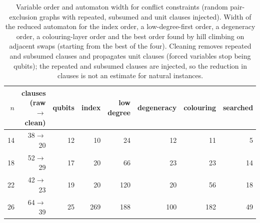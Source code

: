 \begin{table}[t]
\centering\footnotesize\setlength{\tabcolsep}{4pt}
\caption{ Variable order and automaton width for conflict constraints (random pair-exclusion graphs with repeated, subsumed and unit clauses injected). Width of the reduced automaton for the index order, a low-degree-first order, a degeneracy order, a colouring-layer order and the best order found by hill climbing on adjacent swaps (starting from the best of the four). Cleaning removes repeated and subsumed clauses and propagates unit clauses (forced variables stop being qubits); the repeated and subsumed clauses are injected, so the reduction in clauses is not an estimate for natural instances.}\label{tab:large_order}
\begin{tabular}{rrrrrrrr}
\toprule
$n$ & clauses (raw$\to$clean) & qubits & index & low degree & degeneracy & colouring & searched\\
\midrule
14 & 38$\to$20 & 12 & 10 & 24 & 12 & 11 & 5\\
18 & 52$\to$29 & 17 & 20 & 66 & 23 & 23 & 14\\
22 & 42$\to$23 & 19 & 20 & 120 & 20 & 56 & 18\\
26 & 64$\to$39 & 25 & 269 & 188 & 100 & 182 & 49\\
\bottomrule
\end{tabular}
\end{table}

